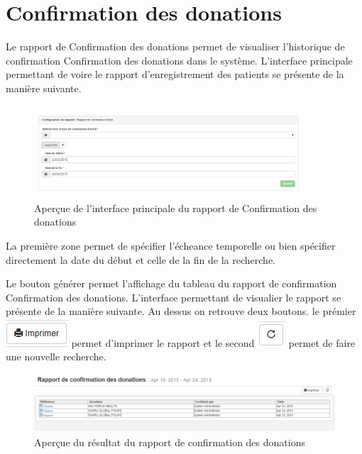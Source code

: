 \documentclass[12pt,a4paper]{report}
\begin{document}
\newpage
\section{Confirmation des donations}
Le rapport de Confirmation des donations permet de visualiser l'historique de confirmation Confirmation des donations dans le système. L'interface principale permettant de voire le rapport d'enregistrement des patients se présente de la manière suivante. 

\begin{figure}[h]
\begin{center}
\includegraphics[width=10cm]{pic/RapConfPO.png}
\end{center}
\caption{Aperçue de l'interface principale du rapport de Confirmation des donations}
\label{Aperçue de l'interface principale du rapport de Confirmation des donations}
\end{figure}


La première zone permet de spécifier l'écheance temporelle  ou bien spécifier directement la date du début et celle de la fin de la recherche. 

Le bouton générer permet l'affichage du tableau du rapport de confirmation Confirmation des donations. L'interface permettant de visualier le rapport se présente de la manière suivante. Au dessus on retrouve deux boutons. le prémier 
\includegraphics[scale=0.7]{pic/Print.png} permet d'imprimer le rapport et le second \includegraphics[scale=0.7]{pic/refresh.png} permet de faire une nouvelle recherche.

\begin{figure}[h]
\begin{center}
\includegraphics[width=12cm]{pic/RapConfDon.png}
\end{center}
\caption{Aperçue du résultat du rapport de confirmation des donations}
\label{Aperçue du résultat du rapport de confirmation des donations}
\end{figure}
\end{document}
